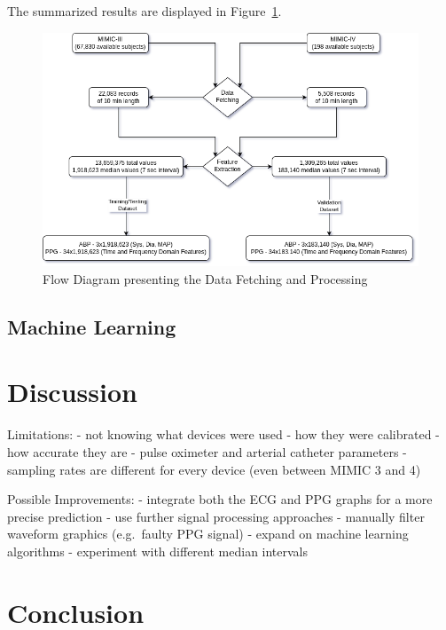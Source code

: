 \documentclass[12pt, bibliography=totoc]{scrartcl}
\begin{document}
    The summarized results are displayed in Figure~\ref{fig:data_flow}.

    \begin{figure}[h]
        \centering
        \includegraphics[scale=0.6]{images/flow_diagrams/flow_diagram}
        \caption{Flow Diagram presenting the Data Fetching and Processing}
        \label{fig:data_flow}
    \end{figure}

    \subsection{Machine Learning}
    \label{subsec:machine_learning}


    \section{Discussion}
    \label{sec:discussion}

    Limitations:
    - not knowing what devices were used
    - how they were calibrated
    - how accurate they are
    - pulse oximeter and arterial catheter parameters
    - sampling rates are different for every device (even between MIMIC 3 and 4)

    Possible Improvements:
    - integrate both the ECG and PPG graphs for a more precise prediction
    - use further signal processing approaches
    - manually filter waveform graphics (e.g.\ faulty PPG signal)
    - expand on machine learning algorithms
    - experiment with different median intervals


    \section{Conclusion}
    \label{sec:conclusion}

    \newpage

    
    
\end{document}
